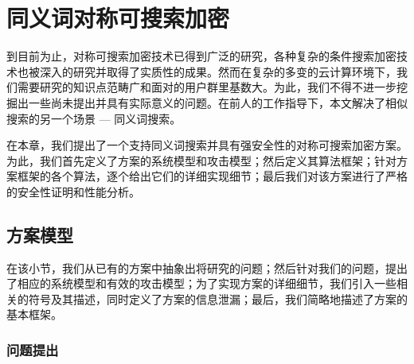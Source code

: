 
\chapter{同义词对称可搜索加密}
\label{chap:synonym}

到目前为止，对称可搜索加密技术已得到广泛的研究，各种复杂的条件搜索加密技术也被深入的研究并取得了实质性的成果。然而在复杂的多变的云计算环境下，我们需要研究的知识点范畴广和面对的用户群里基数大。为此，我们不得不进一步挖掘出一些尚未提出并具有实际意义的问题。在前人的工作指导下，本文解决了相似搜索的另一个场景 --- 同义词搜索。

在本章，我们提出了一个支持同义词搜索并具有强安全性的对称可搜索加密方案。为此，我们首先定义了方案的系统模型和攻击模型；然后定义其算法框架；针对方案框架的各个算法，逐个给出它们的详细实现细节；最后我们对该方案进行了严格的安全性证明和性能分析。



\section{方案模型}
\label{sec:synonym_model}

在该小节，我们从已有的方案中抽象出将研究的问题；然后针对我们的问题，提出了相应的系统模型和有效的攻击模型；为了实现方案的详细细节，我们引入一些相关的符号及其描述，同时定义了方案的信息泄漏；最后，我们简略地描述了方案的基本框架。


\subsection{问题提出}
\label{sec:synonym_problem}


